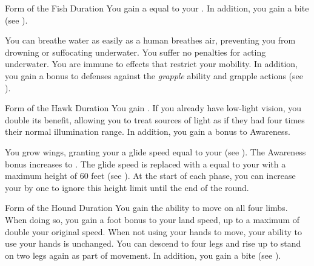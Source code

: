{            \begin{durationability}{Form of the Fish}
                Duration
                \rankline
                You gain a  equal to your .
                In addition, you gain a bite  (see ).

                \rankline
                 You can breathe water as easily as a human breathes air, preventing you from drowning or suffocating underwater.
                 You suffer no penalties for acting underwater.
                 You are immune to  effects that restrict your mobility.
                In addition, you gain a  bonus to defenses against the \textit{grapple} ability and grapple actions (see ).
            \end{durationability}

            \begin{durationability}{Form of the Hawk}
                Duration
                \rankline
                You gain .
                If you already have low-light vision, you double its benefit, allowing you to treat sources of light as if they had four times their normal illumination range.
                In addition, you gain a  bonus to Awareness.

                \rankline
                 You grow wings, granting your a glide speed equal to your  (see ).
                 The Awareness bonus increases to .
                 The glide speed is replaced with a  equal to your  with a maximum height of 60 feet (see ).
                At the start of each phase, you can increase your  by one to ignore this height limit until the end of the round.
            \end{durationability}

            \begin{durationability}{Form of the Hound}
                Duration
                \rankline
                You gain the ability to move on all four limbs.
                When doing so, you gain a  foot bonus to your land speed, up to a maximum of double your original speed.
                When not using your hands to move, your ability to use your hands is unchanged.
                You can descend to four legs and rise up to stand on two legs again as part of movement.
                In addition, you gain a bite  (see ).


\end{durationability}}
